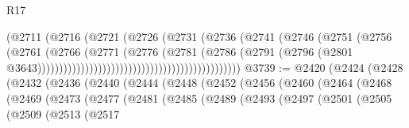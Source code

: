 \begin{lexlean}{R17}
\begin{coremodule}
                                                            (@2711
                                                              (@2716
                                                                (@2721
                                                                  (@2726
                                                                    (@2731
                                                                      (@2736
                                                                        (@2741
                                                                          (@2746
                                                                            (@2751
                                                                              (@2756
                                                                                (@2761
                                                                                  (@2766
                                                                                    (@2771
                                                                                      (@2776
                                                                                        (@2781
                                                                                          (@2786
                                                                                            (@2791
                                                                                              (@2796
                                                                                                (@2801
                                                                                                  @3643)))))))))))))))))))))))))))))))))))))))))))))))
@3739 := @2420
    (@2424
      (@2428
        (@2432
          (@2436
            (@2440
              (@2444
                (@2448
                  (@2452
                    (@2456
                      (@2460
                        (@2464
                          (@2468
                            (@2469
                              (@2473
                                (@2477
                                  (@2481
                                    (@2485
                                      (@2489
                                        (@2493
                                          (@2497
                                            (@2501
                                              (@2505
                                                (@2509
                                                  (@2513
                                                    (@2517

\end{coremodule}
\end{lexlean}
